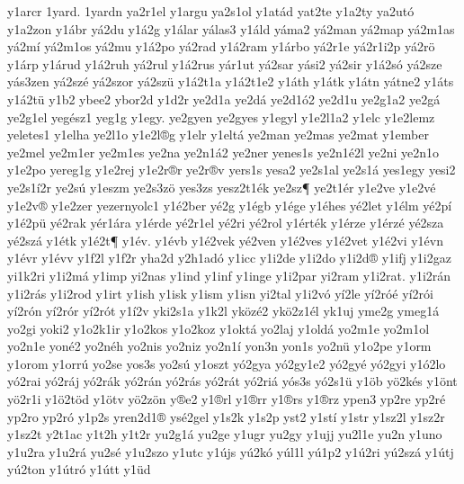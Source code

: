 {y1arcr
1yard.
1yardn
ya2r1el
y1argu
ya2s1ol
y1at^^e1d
yat2te
y1a2ty
ya2ut^^f3
y1a2zon
y1^^e1br
y^^e12du
y1^^e12g
y1^^e1lar
y^^e1las3
y1^^e1ld
y^^e1ma2
y^^e12man
y^^e12map
y^^e12m1as
y^^e12m^^ed
y^^e12m1os
y^^e12mu
y1^^e12po
y^^e12rad
y1^^e12ram
y1^^e1rbo
y^^e12r1e
y^^e12r1i2p
y^^e12r^^f6
y1^^e1rp
y1^^e1rud
y1^^e12ruh
y^^e12rul
y1^^e12rus
y^^e1r1ut
y^^e12sar
y^^e1si2
y^^e12sir
y1^^e12s^^f3
y^^e12sze
y^^e1s3zen
y^^e12sz^^e9
y^^e12szor
y^^e12sz^^fc
y1^^e12t1a
y1^^e12t1e2
y1^^e1th
y1^^e1tk
y1^^e1tn
y^^e1tne2
y1^^e1ts
y1^^e12t^^fc
y1b2
ybee2
ybor2d
y1d2r
ye2d1a
ye2d^^e1
ye2d1^^f32
ye2d1u
ye2g1a2
ye2g^^e1
ye2g1el
yeg^^e9sz1
yeg1g
y1egy.
ye2gyen
ye2gyes
y1egyl
y1e2l1a2
y1elc
y1e2lemz
yeletes1
y1elha
ye2l1o
y1e2l^^aeg
y1elr
y1elt^^e1
ye2man
ye2mas
ye2mat
y1ember
ye2mel
ye2m1er
ye2m1es
ye2na
ye2n1^^e12
ye2ner
yenes1s
ye2n1^^e92l
ye2ni
ye2n1o
y1e2po
yereg1g
y1e2rej
y1e2r^^aer
ye2r^^aev
yers1s
yesa2
ye2s1al
ye2s1^^e1
yes1egy
yesi2
ye2s1^^ed2r
ye2s^^fa
y1eszm
ye2s3z^^f6
yes3zs
yesz2t1^^e9k
ye2sz^^b6
ye2t1^^e9r
y1e2ve
y1e2v^^e9
y1e2v^^ae
y1e2zer
yezernyolc1
y1^^e92ber
y^^e92g
y1^^e9gb
y1^^e9ge
y1^^e9hes
y^^e92let
y1^^e9lm
y^^e92p^^ed
y1^^e92p^^fc
y^^e92rak
y^^e9r1^^e1ra
y1^^e9rde
y^^e92r1el
y^^e92ri
y^^e92rol
y1^^e9rt^^e9k
y1^^e9rze
y1^^e9rz^^e9
y^^e92sza
y^^e92sz^^e1
y1^^e9tk
y1^^e92t^^b6
y1^^e9v.
y1^^e9vb
y1^^e92vek
y^^e92ven
y1^^e92ves
y1^^e92vet
y1^^e92vi
y1^^e9vn
y1^^e9vr
y1^^e9vv
y1f2l
y1f2r
yha2d
y2h1ad^^f3
y1icc
y1i2de
y1i2do
y1i2d^^ae
y1ifj
y1i2gaz
yi1k2ri
y1i2m^^e1
y1imp
yi2nas
y1ind
y1inf
y1inge
y1i2par
yi2ram
y1i2rat.
y1i2r^^e1n
y1i2r^^e1s
y1i2rod
y1irt
y1ish
y1isk
y1ism
y1isn
yi2tal
y1i2v^^f3
y^^ed2le
y^^ed2r^^f3^^e9
y^^ed2r^^f3i
y^^ed2r^^f3n
y^^ed2r^^f3r
y^^ed2r^^f3t
y1^^ed2v
yki2s1a
y1k2l
yk^^f6z^^e92
yk^^f62z1^^e9l
yk1uj
yme2g
ymeg1^^e1
yo2gi
yoki2
y1o2k1ir
y1o2kos
y1o2koz
y1okt^^e1
yo2laj
y1old^^e1
yo2m1e
yo2m1ol
yo2n1e
yon^^e92
yo2n^^e9h
yo2nis
yo2niz
yo2n1^^ed
yon3n
yon1s
yo2n^^fc
y1o2pe
y1orm
y1orom
y1orr^^fa
yo2se
yos3s
yo2s^^fa
y1oszt
y^^f32gya
y^^f32gy1e2
y^^f32gy^^e9
y^^f32gyi
y1^^f32lo
y^^f32rai
y^^f32r^^e1j
y^^f32r^^e1k
y^^f32r^^e1n
y^^f32r^^e1s
y^^f32r^^e1t
y^^f32ri^^e1
y^^f3s3s
y^^f32s1^^fc
y1^^f6b
y^^f62k^^e9s
y1^^f6nt
y^^f62r1i
y1^^f62t^^f6d
y1^^f6tv
y^^f62z^^f6n
y^^aee2
y1^^aerl
y1^^aerr
y1^^aers
y1^^aerz
ypen3
yp2re
yp2r^^e9
yp2ro
yp2r^^f3
y1p2s
yren2d1^^ae
ys^^e92gel
y1s2k
y1s2p
yst2
y1st^^ed
y1str
y1sz2l
y1sz2r
y1sz2t
y2t1ac
y1t2h
y1t2r
yu2g1^^e1
yu2ge
y1ugr
yu2gy
y1ujj
yu2l1e
yu2n
y1uno
y1u2ra
y1u2r^^e1
yu2s^^e9
y1u2szo
y1utc
y1^^fajs
y^^fa2k^^f3
y^^fal1l
y^^fa1p2
y1^^fa2ri
y^^fa2sz^^e1
y1^^fatj
y^^fa2ton
y1^^fatr^^f3
y1^^fatt
y1^^fcd
}
